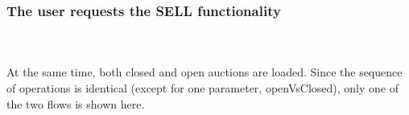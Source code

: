 \documentclass[12pt, a4paper, renqo, final]{amsart}
\begin{document}
			\subsubsection{The user requests the SELL functionality}
				\phantom{.}\\
				\noindent {}	
				\phantom{.}\\
				At the same time, both closed and open auctions are loaded. Since the sequence of operations is identical (except for one parameter, openVsClosed), only one of the two flows is shown here.
				\phantom{.}\\
				\noindent {}	
				\phantom{.}\\
				\newpage
\end{document}

